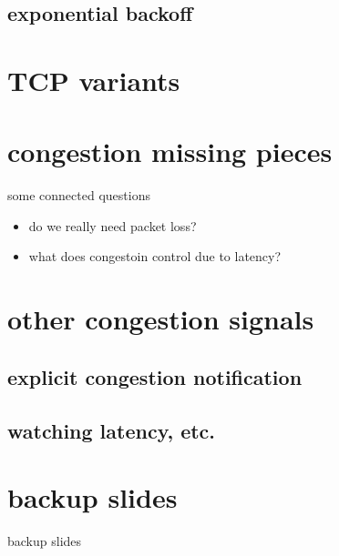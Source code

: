\subsection{exponential backoff}


\section{TCP variants}


\section{congestion missing pieces}
\begin{frame}{some connected questions}
    \begin{itemize}
    \item do we really need packet loss?
    \item what does congestoin control due to latency?
    \end{itemize}
\end{frame}

\section{other congestion signals}



\subsection{explicit congestion notification}



\subsection{watching latency, etc.}






\section{backup slides}
\begin{frame}{backup slides}
\end{frame}


